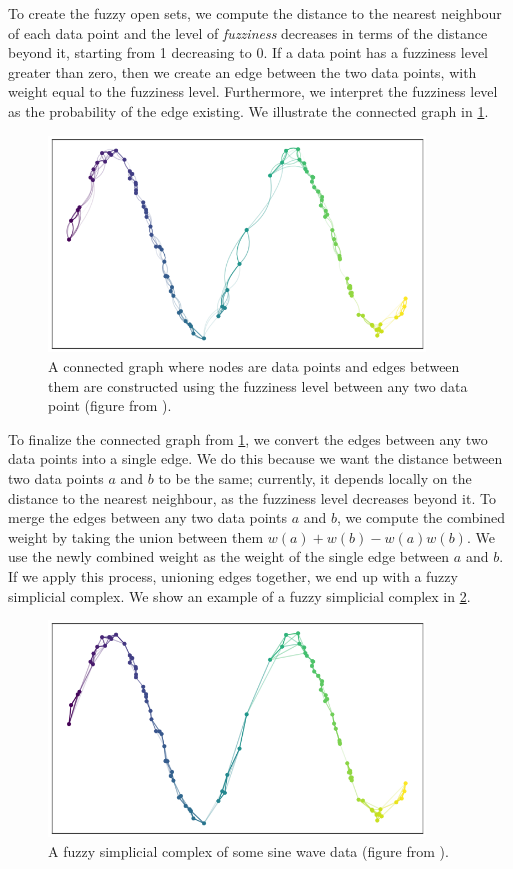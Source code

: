 To create the fuzzy open sets, we compute the distance to the nearest neighbour of each data point and the level of \textit{fuzziness} decreases in terms of the distance beyond it, starting from 1 decreasing to 0. If a data point has a fuzziness level greater than zero, then we create an edge between the two data points, with weight equal to the fuzziness level. Furthermore, we interpret the fuzziness level as the probability of the edge existing. We illustrate the connected graph in \cref{fig:how_umap_works_raw_graph}.

\begin{figure}[H]
    \centering
    \includegraphics[width=10cm]{thesis/figures/how_umap_works_raw_graph.png}
    \caption{A connected graph where nodes are data points and edges between them are constructed using the fuzziness level between any two data point (figure from \cite{how-umap-works-2018}).}
    \label{fig:how_umap_works_raw_graph}
\end{figure}
To finalize the connected graph from \cref{fig:how_umap_works_raw_graph}, we convert the edges between any two data points into a single edge. We do this because we want the distance between two data points $a$ and $b$ to be the same; currently, it depends locally on the distance to the nearest neighbour, as the fuzziness level decreases beyond it. To merge the edges between any two data points $a$ and $b$, we compute the combined weight by taking the union between them $w(a) + w(b) - w(a)w(b)$. We use the newly combined weight as the weight of the single edge between $a$ and $b$. If we apply this process, unioning edges together, we end up with a fuzzy simplicial complex. We show an example of a fuzzy simplicial complex in \cref{fig:how_umap_works_umap_graph}.
\begin{figure}[H]
    \centering
    \includegraphics[width=10cm]{thesis/figures/how_umap_works_umap_graph.png}
    \caption{A fuzzy simplicial complex of some sine wave data (figure from \cite{how-umap-works-2018}).}
    \label{fig:how_umap_works_umap_graph}
\end{figure}
